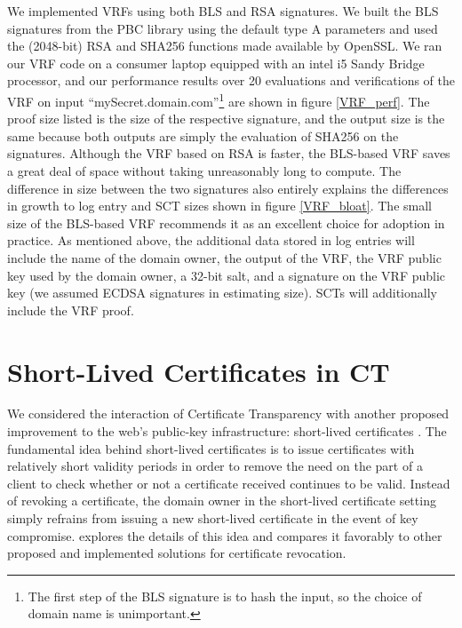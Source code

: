\documentclass[letterpaper,twocolumn,10pt]{article}
\begin{document}
We implemented VRFs using both BLS and RSA signatures. We built the BLS signatures from the PBC library \cite{PBC} using the default type A parameters and used the (2048-bit) RSA and SHA256 functions made available by OpenSSL. We ran our VRF code on a consumer laptop equipped with an intel i5 Sandy Bridge processor, and our performance results over 20 evaluations and verifications of the VRF on input ``mySecret.domain.com''\footnote{The first step of the BLS signature is to hash the input, so the choice of domain name is unimportant.} are shown in figure \ref{VRF_perf}. The proof size listed is the size of the respective signature, and the output size is the same because both outputs are simply the evaluation of SHA256 on the signatures. Although the VRF based on RSA is faster, the BLS-based VRF saves a great deal of space without taking unreasonably long to compute. The difference in size between the two signatures also entirely explains the differences in growth to log entry and SCT sizes shown in figure \ref{VRF_bloat}. The small size of the BLS-based VRF recommends it as an excellent choice for adoption in practice. As mentioned above, the additional data stored in log entries will include the name of the domain owner, the output of the VRF, the VRF public key used by the domain owner, a 32-bit salt, and a signature on the VRF public key (we assumed ECDSA signatures in estimating size). SCTs will additionally include the VRF proof.

\section{Short-Lived Certificates in CT}
We considered the interaction of Certificate Transparency with another proposed improvement to the web's public-key infrastructure: short-lived certificates \cite{Riv98}. The fundamental idea behind short-lived certificates is to issue certificates with relatively short validity periods in order to remove the need on the part of a client to check whether or not a certificate received continues to be valid. Instead of revoking a certificate, the domain owner in the short-lived certificate setting simply refrains from issuing a new short-lived certificate in the event of key compromise. \cite{TSH+12} explores the details of this idea and compares it favorably to other proposed and implemented solutions for certificate revocation. 
\end{document}

